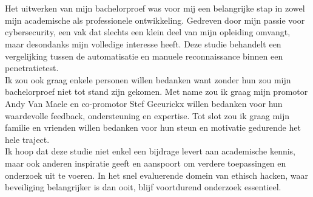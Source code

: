 
\chapter*{}%
\label{ch:voorwoord}


Het uitwerken van mijn bachelorproef was voor mij een belangrijke stap in zowel mijn academische als professionele ontwikkeling.
Gedreven door mijn passie voor cybersecurity, een vak dat slechts een klein deel van mijn opleiding omvangt, maar desondanks mijn volledige interesse heeft.
Deze studie behandelt een vergelijking tussen de automatisatie en manuele reconnaissance binnen een penetratietest. \\

Ik zou ook graag enkele personen willen bedanken want zonder hun zou mijn bachelorproef niet tot stand zijn gekomen.
Met name zou ik graag mijn promotor Andy Van Maele en co-promotor Stef Geeurickx willen bedanken voor hun waardevolle feedback, ondersteuning en expertise.
Tot slot zou ik graag mijn familie en vrienden willen bedanken voor hun steun en motivatie gedurende het hele traject. \\

Ik hoop dat deze studie niet enkel een bijdrage levert aan academische kennis, maar ook anderen inspiratie geeft en aanspoort om verdere toepassingen en onderzoek uit te voeren. 
In het snel evaluerende domein van ethisch hacken, waar beveiliging belangrijker is dan ooit, blijf voortdurend onderzoek essentieel.

